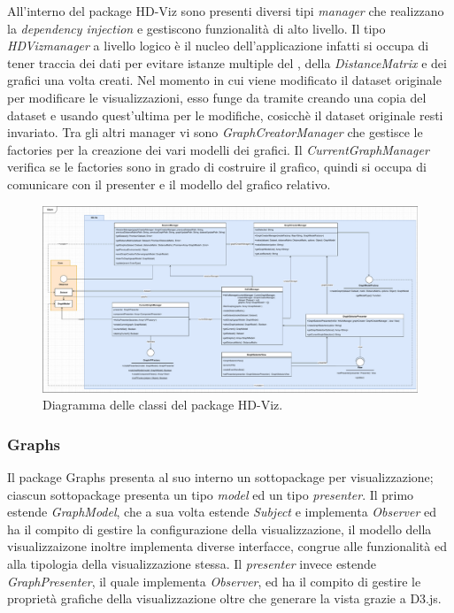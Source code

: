 \documentclass[../manuale_sviluppatore.tex]{subfiles}
\begin{document}
All'interno del package HD-Viz sono presenti diversi tipi \emph{manager} che realizzano la 
\emph{dependency injection} e gestiscono funzionalità di alto livello. Il tipo \emph{HDVizmanager} 
a livello logico è il nucleo dell'applicazione infatti si occupa di tener traccia dei dati per 
evitare istanze multiple del , della \emph{DistanceMatrix} e dei grafici una 
volta creati. Nel momento in cui viene modificato il dataset originale per modificare le 
visualizzazioni, esso funge da tramite creando una copia del dataset e usando quest'ultima per le 
modifiche, cosicchè il dataset originale resti invariato.
Tra gli altri manager vi sono \emph{GraphCreatorManager} che gestisce le factories per la 
creazione dei vari modelli dei grafici. Il \emph{CurrentGraphManager} verifica se le factories sono 
in grado di costruire il grafico, quindi si occupa di comunicare con il presenter e il modello del 
grafico relativo.

\begin{figure}[H]
	\centering
	\includegraphics[width=18cm]{src/img/hdviz.pdf}
	\caption{Diagramma delle classi del package HD-Viz.}
\end{figure}


\subsubsection*{Graphs}

Il package Graphs presenta al suo interno un sottopackage per visualizzazione; ciascun sottopackage 
presenta un tipo \emph{model} ed un tipo \emph{presenter}. Il primo estende \emph{GraphModel}, che 
a sua volta estende \emph{Subject} e implementa \emph{Observer} ed ha il compito di gestire la 
configurazione della visualizzazione, il modello della visualizzaizone inoltre implementa diverse 
interfacce, congrue alle  funzionalità ed alla tipologia della visualizzazione stessa. Il 
\emph{presenter} invece estende \emph{GraphPresenter}, il quale implementa \emph{Observer}, ed ha 
il compito di gestire le proprietà grafiche della visualizzazione oltre che generare la 
vista grazie a D3.js.
\end{document}
